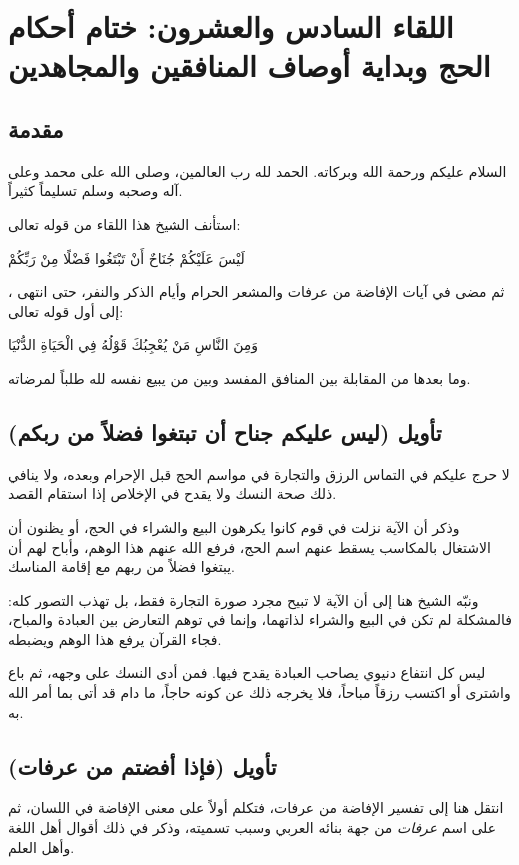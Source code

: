 \chapter{اللقاء السادس والعشرون: ختام أحكام الحج وبداية أوصاف المنافقين والمجاهدين}

\section{مقدمة}
السلام عليكم ورحمة الله وبركاته. الحمد لله رب العالمين، وصلى الله على محمد وعلى آله وصحبه وسلم تسليماً كثيراً.

استأنف الشيخ هذا اللقاء من قوله تعالى: \begin{ayah}لَيْسَ عَلَيْكُمْ جُنَاحٌ أَنْ تَبْتَغُوا فَضْلًا مِنْ رَبِّكُمْ\end{ayah}، ثم مضى في آيات الإفاضة من عرفات والمشعر الحرام وأيام الذكر والنفر، حتى انتهى إلى أول قوله تعالى: \begin{ayah}وَمِنَ النَّاسِ مَنْ يُعْجِبُكَ قَوْلُهُ فِي الْحَيَاةِ الدُّنْيَا\end{ayah} وما بعدها من المقابلة بين المنافق المفسد وبين من يبيع نفسه لله طلباً لمرضاته.

\separator

\section{تأويل (ليس عليكم جناح أن تبتغوا فضلاً من ربكم)}
 لا حرج عليكم في التماس الرزق والتجارة في مواسم الحج قبل الإحرام وبعده، ولا ينافي ذلك صحة النسك ولا يقدح في الإخلاص إذا استقام القصد.

وذكر  أن الآية نزلت في قوم كانوا يكرهون البيع والشراء في الحج، أو يظنون أن الاشتغال بالمكاسب يسقط عنهم اسم الحج، فرفع الله عنهم هذا الوهم، وأباح لهم أن يبتغوا فضلاً من ربهم مع إقامة المناسك.

ونبّه الشيخ هنا إلى أن الآية لا تبيح مجرد صورة التجارة فقط، بل تهذب التصور كله: فالمشكلة لم تكن في البيع والشراء لذاتهما، وإنما في توهم التعارض بين العبادة والمباح، فجاء القرآن يرفع هذا الوهم ويضبطه.

\begin{fawaid}
ليس كل انتفاع دنيوي يصاحب العبادة يقدح فيها. فمن أدى النسك على وجهه، ثم باع واشترى أو اكتسب رزقاً مباحاً، فلا يخرجه ذلك عن كونه حاجاً، ما دام قد أتى بما أمر الله به.
\end{fawaid}

\separator

\section{تأويل (فإذا أفضتم من عرفات)}
انتقل  هنا إلى تفسير الإفاضة من عرفات، فتكلم أولاً على معنى الإفاضة في اللسان، ثم على اسم \textit{عرفات} من جهة بنائه العربي وسبب تسميته، وذكر في ذلك أقوال أهل اللغة وأهل العلم.

